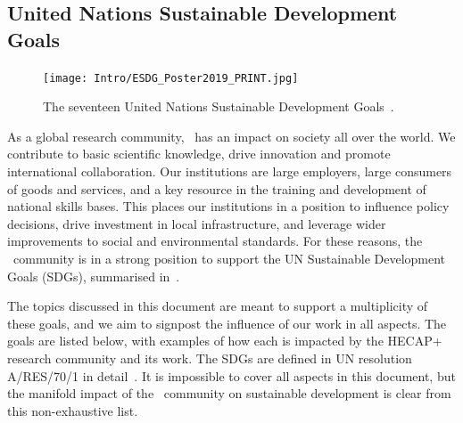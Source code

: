 \documentclass[../SustainableHEP.tex]{subfiles}
\begin{document}

\newpage
\subsection{United Nations Sustainable Development Goals}


\begin{figure}[!ht]
     \centering
     \texttt{[image: Intro/ESDG\_Poster2019\_PRINT.jpg]}
     \caption[United Nations Sustainable Development Goals]{The seventeen United Nations Sustainable Development Goals~\cite{UNSustainableGoalsFigure}.\label{fig:17_UN_SustGoals}}
\end{figure}


As a global research community, \ACR\ has an impact on society all over the world. We contribute to basic scientific knowledge, drive innovation and promote international collaboration. Our institutions are large employers, large consumers of goods and services, and a key resource in the training and development of national skills bases. This places our institutions in a position to influence policy decisions, drive investment in local infrastructure, and leverage wider improvements to social and environmental standards. For these reasons, the \ACR\ community is in a strong position to support the UN Sustainable Development Goals (SDGs), summarised in~.

The topics discussed in this document are meant to support a multiplicity of these goals, and we aim to signpost the influence of our work in all aspects. The goals are listed below, with examples of how each is impacted by the HECAP+ research community and its work. The SDGs are defined in UN resolution A/RES/70/1 in detail~\cite{UNResolutionARES701}. It is impossible to cover all aspects in this document, but the manifold impact of the \ACR\ community on sustainable development is clear from this non-exhaustive list. 

\bigskip

\end{document}
